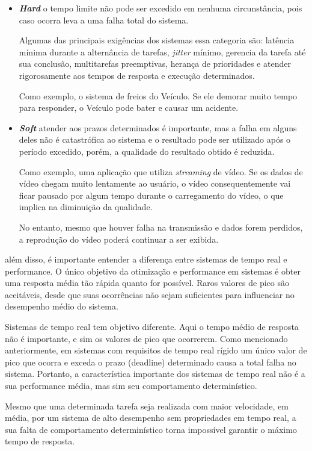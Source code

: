 \documentclass[conference]{IEEEtran}
\begin{document}
\begin{itemize}
	\item \textit{\textbf{Hard}} o tempo limite não pode ser excedido em nenhuma circunstância, pois caso ocorra leva a uma falha total do sistema. 
	
	Algumas das principais exigências dos sistemas essa categoria são: latência mínima durante a alternância de tarefas, \textit{jitter} mínimo, gerencia da tarefa até sua conclusão, multitarefas preemptivas, herança de prioridades e atender rigorosamente aos tempos de resposta e execução determinados.
	
	Como exemplo, o sistema de freios do Veículo. Se ele demorar muito tempo para responder, o Veículo pode bater e causar um acidente.
	
	\item \textit{\textbf{Soft}} atender aos prazos determinados é importante, mas a falha em alguns deles não é catastrófica ao sistema e o resultado pode ser utilizado após o período excedido, porém, a qualidade do resultado obtido é reduzida.
	
	Como exemplo, uma aplicação que utiliza \textit{streaming} de vídeo. Se os dados de vídeo chegam muito lentamente ao usuário, o vídeo consequentemente vai ficar pausado por algum tempo durante o carregamento do vídeo, o que implica na diminuição da qualidade. 
	
	No entanto, mesmo que houver falha na transmissão e dados forem perdidos, a reprodução do vídeo poderá continuar a ser exibida.
\end{itemize}

além disso, é importante entender a diferença entre sistemas de tempo real e performance. O único objetivo da otimização e performance em sistemas é obter uma resposta média tão rápida quanto for possível. Raros valores de pico são aceitáveis, desde que suas ocorrências não sejam suficientes para influenciar no desempenho médio do sistema.

Sistemas de tempo real tem objetivo diferente. Aqui o tempo médio de resposta não é importante, e sim os valores de pico que ocorrerem. Como mencionado anteriormente, em sistemas com requisitos de tempo real rígido um único valor de pico que ocorra e exceda o prazo (deadline) determinado causa a total falha no sistema. Portanto, a característica importante dos sistemas de tempo real não é a sua performance média, mas sim seu comportamento determinístico. 

Mesmo que uma determinada tarefa seja realizada com maior velocidade, em média, por um sistema de alto desempenho sem propriedades em tempo real, a sua falta de comportamento determinístico torna impossível garantir o máximo tempo de resposta.
\end{document}
